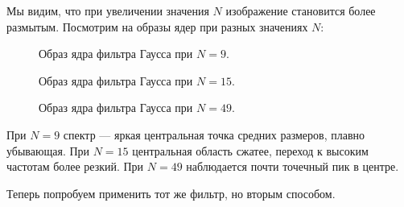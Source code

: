 \documentclass[a4paper]{article}
\begin{document}
\noindent Мы видим, что при увеличении значения $N$ изображение становится более размытым. Посмотрим на образы ядер при разных значениях $N$:

\begin{figure}[H]
  \centering
  
  \caption{Образ ядра фильтра Гаусса при $N=9$.}
\end{figure}
\begin{figure}[H]
  \centering
  
  \caption{Образ ядра фильтра Гаусса при $N=15$.}
\end{figure}
\begin{figure}[H]
  \centering
  
  \caption{Образ ядра фильтра Гаусса при $N=49$.}
\end{figure}

\noindent При $N=9$ спектр — яркая центральная точка средних размеров, плавно убывающая. При $N=15$ центральная область сжатее, переход к высоким частотам более резкий.  При $N=49$ наблюдается почти точечный пик в центре.

Теперь попробуем применить тот же фильтр, но вторым способом.
\end{document}

